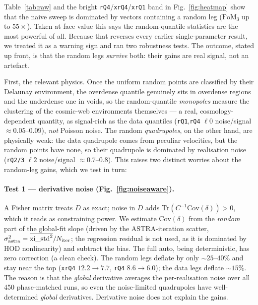\documentclass[11pt]{article}
\newcommand{\FoM}{\mathrm{FoM}}
\newcommand{\code}[1]{\texttt{#1}}
\begin{document}
Table~\ref{tab:raw} and the bright \code{rQ4}/\code{xrQ4}/\code{xrQ1} band in
Fig.~\ref{fig:heatmap} show that the naive sweep is dominated by vectors
containing a random leg ($\FoM_3$ up to $55\times$).  Taken at face value this
says the random-quantile statistics are the most powerful of all.  Because that
reverses every earlier single-parameter result, we treated it as a warning sign
and ran two robustness tests.  The outcome, stated up front, is that the random
legs \emph{survive} both: their gains are real signal, not an artefact.

First, the relevant physics.  Once the uniform random points are classified by
their Delaunay environment, the overdense quantile genuinely sits in overdense
regions and the underdense one in voids, so the random-quantile \emph{monopoles}
measure the clustering of the cosmic-web environments themselves --- a real,
cosmology-dependent quantity, as signal-rich as the data quantiles
(\code{rQ1},\code{rQ4} $\ell0$ noise/signal $\approx 0.05$--$0.09$), \emph{not}
Poisson noise.  The random \emph{quadrupoles}, on the other hand, are physically
weak: the data quadrupole comes from peculiar velocities, but the random points
have none, so their quadrupole is dominated by realisation noise
(\code{rQ2/3} $\ell2$ noise/signal $\approx 0.7$--$0.8$).  This raises two
distinct worries about the random-leg gains, which we test in turn:

\paragraph{Test 1 --- derivative noise (Fig.~\ref{fig:noiseaware}).}
A Fisher matrix treats $D$ as exact; noise in $D$ adds
$\mathrm{Tr}(C^{-1}\mathrm{Cov}(\delta))>0$, which it reads as constraining power.
We estimate $\mathrm{Cov}(\delta)$ from the \emph{random} part of the global-fit
slope (driven by the ASTRA-iteration scatter, $\sigma_{\rm astra}^2 =
\overline{\mathrm{xi\_std}^2}/N_{\rm iter}$; the regression residual is not used,
as it is dominated by HOD nonlinearity) and subtract the bias.  The full auto,
being deterministic, has zero correction (a clean check).  The random legs deflate
by only $\sim\!25$--$40\%$ and stay near the top (\code{xrQ4} $12.2\to7.7$,
\code{rQ4} $8.6\to6.0$); the data legs deflate $\sim\!15\%$.  The reason is that
the \emph{global} derivative averages the per-realisation noise over all 450
phase-matched runs, so even the noise-limited quadrupoles have well-determined
\emph{global} derivatives.  Derivative noise does not explain the gains.
\end{document}
